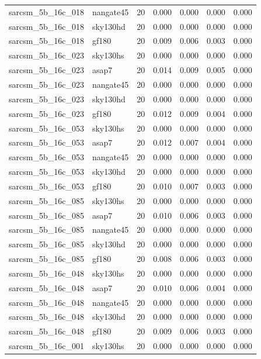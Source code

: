 \begin{tabular}{llrrrrr}
sarcsm\_5b\_16c\_018 & nangate45 & 20 & 0.000 & 0.000 & 0.000 & 0.000 \\
sarcsm\_5b\_16c\_018 & sky130hd & 20 & 0.000 & 0.000 & 0.000 & 0.000 \\
sarcsm\_5b\_16c\_018 & gf180 & 20 & 0.009 & 0.006 & 0.003 & 0.000 \\
sarcsm\_5b\_16c\_023 & sky130hs & 20 & 0.000 & 0.000 & 0.000 & 0.000 \\
sarcsm\_5b\_16c\_023 & asap7 & 20 & 0.014 & 0.009 & 0.005 & 0.000 \\
sarcsm\_5b\_16c\_023 & nangate45 & 20 & 0.000 & 0.000 & 0.000 & 0.000 \\
sarcsm\_5b\_16c\_023 & sky130hd & 20 & 0.000 & 0.000 & 0.000 & 0.000 \\
sarcsm\_5b\_16c\_023 & gf180 & 20 & 0.012 & 0.009 & 0.004 & 0.000 \\
sarcsm\_5b\_16c\_053 & sky130hs & 20 & 0.000 & 0.000 & 0.000 & 0.000 \\
sarcsm\_5b\_16c\_053 & asap7 & 20 & 0.012 & 0.007 & 0.004 & 0.000 \\
sarcsm\_5b\_16c\_053 & nangate45 & 20 & 0.000 & 0.000 & 0.000 & 0.000 \\
sarcsm\_5b\_16c\_053 & sky130hd & 20 & 0.000 & 0.000 & 0.000 & 0.000 \\
sarcsm\_5b\_16c\_053 & gf180 & 20 & 0.010 & 0.007 & 0.003 & 0.000 \\
sarcsm\_5b\_16c\_085 & sky130hs & 20 & 0.000 & 0.000 & 0.000 & 0.000 \\
sarcsm\_5b\_16c\_085 & asap7 & 20 & 0.010 & 0.006 & 0.003 & 0.000 \\
sarcsm\_5b\_16c\_085 & nangate45 & 20 & 0.000 & 0.000 & 0.000 & 0.000 \\
sarcsm\_5b\_16c\_085 & sky130hd & 20 & 0.000 & 0.000 & 0.000 & 0.000 \\
sarcsm\_5b\_16c\_085 & gf180 & 20 & 0.008 & 0.006 & 0.003 & 0.000 \\
sarcsm\_5b\_16c\_048 & sky130hs & 20 & 0.000 & 0.000 & 0.000 & 0.000 \\
sarcsm\_5b\_16c\_048 & asap7 & 20 & 0.010 & 0.006 & 0.004 & 0.000 \\
sarcsm\_5b\_16c\_048 & nangate45 & 20 & 0.000 & 0.000 & 0.000 & 0.000 \\
sarcsm\_5b\_16c\_048 & sky130hd & 20 & 0.000 & 0.000 & 0.000 & 0.000 \\
sarcsm\_5b\_16c\_048 & gf180 & 20 & 0.009 & 0.006 & 0.003 & 0.000 \\
sarcsm\_5b\_16c\_001 & sky130hs & 20 & 0.000 & 0.000 & 0.000 & 0.000 \\

\end{tabular}
